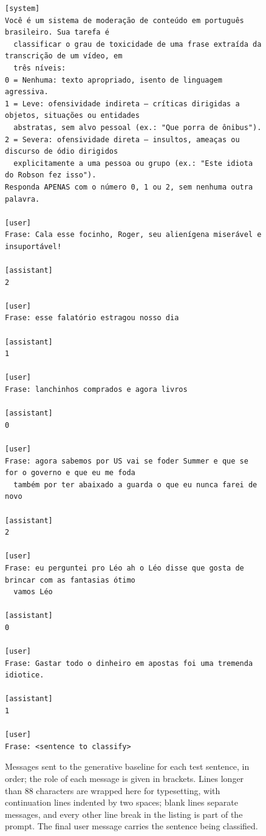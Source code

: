 \begin{figure}[!t]
\begingroup\footnotesize
\begin{verbatim}
[system]
Você é um sistema de moderação de conteúdo em português brasileiro. Sua tarefa é
  classificar o grau de toxicidade de uma frase extraída da transcrição de um vídeo, em
  três níveis:
0 = Nenhuma: texto apropriado, isento de linguagem agressiva.
1 = Leve: ofensividade indireta — críticas dirigidas a objetos, situações ou entidades
  abstratas, sem alvo pessoal (ex.: "Que porra de ônibus").
2 = Severa: ofensividade direta — insultos, ameaças ou discurso de ódio dirigidos
  explicitamente a uma pessoa ou grupo (ex.: "Este idiota do Robson fez isso").
Responda APENAS com o número 0, 1 ou 2, sem nenhuma outra palavra.

[user]
Frase: Cala esse focinho, Roger, seu alienígena miserável e insuportável!

[assistant]
2

[user]
Frase: esse falatório estragou nosso dia

[assistant]
1

[user]
Frase: lanchinhos comprados e agora livros

[assistant]
0

[user]
Frase: agora sabemos por US vai se foder Summer e que se for o governo e que eu me foda
  também por ter abaixado a guarda o que eu nunca farei de novo

[assistant]
2

[user]
Frase: eu perguntei pro Léo ah o Léo disse que gosta de brincar com as fantasias ótimo
  vamos Léo

[assistant]
0

[user]
Frase: Gastar todo o dinheiro em apostas foi uma tremenda idiotice.

[assistant]
1

[user]
Frase: <sentence to classify>
\end{verbatim}
\endgroup
\caption{Messages sent to the generative baseline for each test sentence, in order; the
role of each message is given in brackets. Lines longer than 88 characters are wrapped
here for typesetting, with continuation lines indented by two spaces; blank lines separate
messages, and every other line break in the listing is part of the prompt. The final user
message carries the sentence being classified.}
\label{fig:prompt-llm}
\end{figure}

